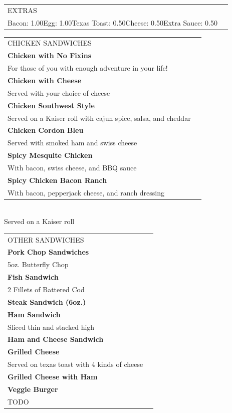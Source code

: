 \documentclass[10pt,notitlepage]{article}
\makeatletter
\newcommand*\ColText[1]{\uppercase{#1}}
\newenvironment{Group}[1]
	{\noindent\begin{tabular*}{\textwidth}{@{}p{.8\linewidth}@{\extracolsep{\fill}}r@{}}
		{\fontsize{16}{20}\selectfont\ColText{#1}}\\[0.8em]}
	{\end{tabular*}}
\newcommand*\Item[3]{%
	\sffamily\textbf{\large#1}\dotfill & {\large#2}\hspace*{0.5cm}{\large#3}}
\newcommand*\Desc[1]{%
	\sffamily\hspace*{0.5cm}#1}
\makeatother
\begin{document}
	\vfill{}

	\begin{Group}{Extras}
		\centering Bacon: 1.00\hspace{0.2in}Egg: 1.00\hspace{0.2in}Texas Toast: 0.50\hspace{0.2in}Cheese: 0.50\hspace{0.2in}Extra Sauce: 0.50\par
	\end{Group}

	\vfill{}

	\begin{Group}{Chicken Sandwiches}
		\Item{Chicken with No Fixins}{}{5.25} \\
		\Desc{For those of you with enough adventure in your life!} \\
		\Item{Chicken with Cheese}{}{5.75} \\
		\Desc{Served with your choice of cheese} \\
		\Item{Chicken Southwest Style}{}{6.50} \\
		\Desc{Served on a Kaiser roll with cajun spice, salsa, and cheddar} \\
		\Item{Chicken Cordon Bleu}{}{6.50} \\
		\Desc{Served with smoked ham and swiss cheese} \\
		\Item{Spicy Mesquite Chicken}{}{6.75} \\
		\Desc{With bacon, swiss cheese, and BBQ sauce} \\
		\Item{Spicy Chicken Bacon Ranch}{}{6.75} \\
		\Desc{With bacon, pepperjack cheese, and ranch dressing} \\
	\end{Group}
	\\[\baselineskip]
	\centering Served on a Kaiser roll \\

	\vfill{}

	\begin{Group}{Other Sandwiches}
		\Item{Pork Chop Sandwiches}{}{5.50} \\
		\Desc{5oz. Butterfly Chop} \\
		\Item{Fish Sandwich}{}{5.00} \\
		\Desc{2 Fillets of Battered Cod} \\
		\Item{Steak Sandwich (6oz.)}{}{10.00} \\
		\Item{Ham Sandwich}{}{4.75} \\
		\Desc{Sliced thin and stacked high} \\
		\Item{Ham and Cheese Sandwich}{}{5.25} \\
		\Item{Grilled Cheese}{}{5.50} \\
		\Desc{Served on texas toast with 4 kinds of cheese} \\
		\Item{Grilled Cheese with Ham}{}{7.00} \\
		\Item{Veggie Burger}{}{8.00} \\
		\Desc{TODO}
	\end{Group}
\end{document}
